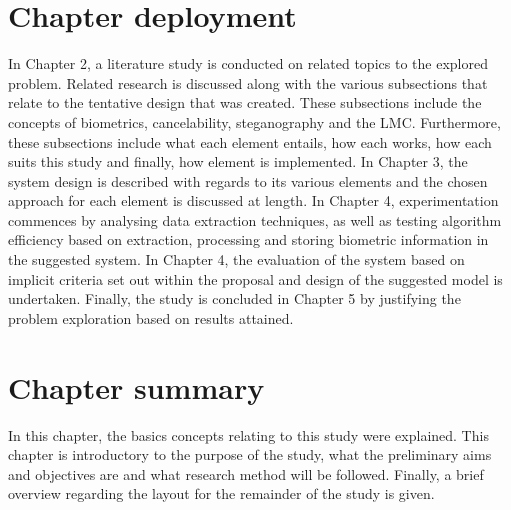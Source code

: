 \section{Chapter deployment}  %
\label{section1.6}
In Chapter 2, a literature study is conducted on related topics to the explored problem. Related research is discussed along with the various subsections that relate to the tentative design that was created. These subsections include the concepts of biometrics, cancelability, steganography and the LMC. Furthermore, these subsections include what each element entails, how each works, how each suits this study and finally, how element is implemented.
In Chapter 3, the system design is described with regards to its various elements and the chosen approach for each element is discussed at length.
In Chapter 4, experimentation commences by analysing data extraction techniques, as well as testing algorithm efficiency based on extraction, processing and storing biometric information in the suggested system. In Chapter 4, the evaluation of the system based on implicit criteria set out within the proposal and design of the suggested model is undertaken.
Finally, the study is concluded in Chapter 5 by justifying the problem exploration based on results attained.

\section{Chapter summary}
\label{section1.7}
In this chapter, the basics concepts relating to this study were explained. This chapter is introductory to the purpose of the study, what the preliminary aims and objectives are and what research method will be followed. Finally, a brief overview regarding the layout for the remainder of the study is given.
